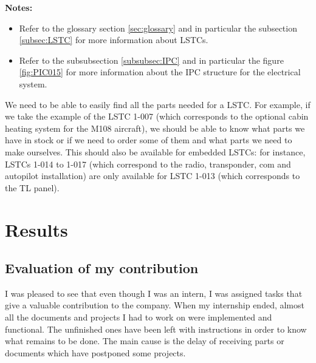 \documentclass[11pt,a4paper]{article}
\begin{document}
\bigskip

\textbf{Notes:} 
\begin{itemize}
\item Refer to the glossary section \ref{sec:glossary} and in particular the subsection \ref{subsec:LSTC} for more information about LSTCs.
\item Refer to the subsubsection \ref{subsubsec:IPC} and in particular the figure \ref{fig:PIC015} for more information about the IPC structure for the electrical system.
\end{itemize}

\bigskip

We need to be able to easily find all the parts needed for a LSTC. For example, if we take the example of the LSTC 1-007 (which corresponds to the optional cabin heating system for the M108 aircraft), we should be able to know what parts we have in stock or if we need to order some of them and what parts we need to make ourselves.
This should also be available for embedded LSTCs: for instance, LSTCs 1-014 to 1-017 (which correspond to the radio, transponder, com and autopilot installation) are only available for LSTC 1-013 (which corresponds to the TL panel).


\newpage

\section{Results}
\subsection{Evaluation of my contribution}
 I was pleased to see that even though I was an intern, I was assigned tasks that give a valuable contribution to the company. When my internship ended, almost all the documents and projects I had to work on were implemented and functional. The unfinished ones have been left with instructions in order to know what remains to be done. The main cause is the delay of receiving parts or documents which have postponed some projects.
\end{document}
